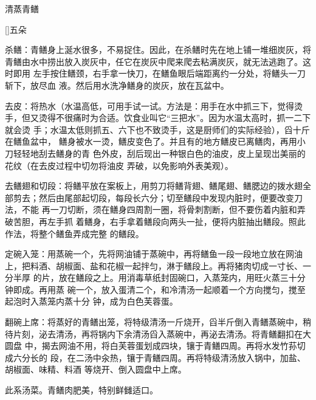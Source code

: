 \begin{recipe}{清蒸青鳝}

\ingredients

[\footnotemark]{五朵}

\preparation

\step 杀鳝：青鳝身上涎水很多，不易捉住。因此，在杀鳝时先在地上铺一堆细炭灰，将
青鳝由水中捞出放入炭灰中，任它在炭灰中爬来爬去粘满炭灰，就无法逃跑了。这时即用
左手按住鳝颈，右手拿一快刀，在鳝鱼眼后端距离约一分处，将鳝头一刀斩下，放尽血
液。然后用水洗净鳝身的炭灰，放在瓦盆中。

\step 去皮：将热水（水温高低，可用手试一试。方法是：用手在水中抓三下，觉得烫
手，但又烫得不很痛时为合适。饮食业叫它“三把水”。因为水温太高时，抓一二下就会烫
手；水温太低则抓五、六下也不致烫手，这是厨师们的实际经验），舀十斤在鳝鱼盆中，
鳝身被水一烫，鳝皮变色了。并且有的地方鳝皮已离鳝肉，再用小刀轻轻地刮去鳝身的青
色外皮，刮后现出一种银白色的油皮，皮上呈现岀美丽的花纹（在去皮过程中切勿将油皮
弄破，以免影响外表美观）。

\step 去鳝翅和切段：将鳝平放在案板上，用剪刀将鳝背翅、鳝尾翅、鳝腮边的拨水翅全
部剪去；然后由尾部起切段，每段长六分；切至鳝段中发现内脏时，便要改变刀法，不能
再一刀切断，须在鳝身四周割一圈，将骨刺割断，但不要伤着内脏和弄破苦胆，再左手抓
着鳝身，右手拿着鳝段向两头一扯，便将内脏抽出鳝段。照此作法，将整个鳝鱼弄成完整
的鳝段。

\step 定碗入笼：用蒸碗一个，先将网油铺于蒸碗中，再将鳝鱼一段一段地立放在网油
上，把料酒、胡椒面、盐和花椒一起拌匀，淋于鳝段上。再将猪肉切成一寸长、一分半厚
的片，放在鳝段之上。用消毒草纸封固碗口，入蒸笼内，用旺火蒸三十分钟即成。再用蒸
碗一个，放入蛋清二个，和冷清汤一起顺着一个方向搅匀，搅至起泡时入蒸笼内蒸十分
钟，成为白色芙蓉蛋。

\step 翻碗上席：将蒸好的青鳝出笼，将特级清汤一斤烧开，舀半斤倒入青鳝蒸碗中，稍
待片刻，泌去清汤，再将锅内下余清汤舀入蒸碗中，再泌去清汤。将青鳝翻扣在大圆盘
中，揭去网油不用，将白芙蓉蛋划成四块，镶于青鳝四周。再将水发竹荪切成六分长的
段，在二汤中汆热，镶于青鳝四周。再将特级清汤放入锅中，加盐、胡椒面、味精、料酒
等烧开、倒入圆盘中上席。

\features

此系汤菜。青鳝肉肥美，特别鲜雠适口。


\end{recipe}

